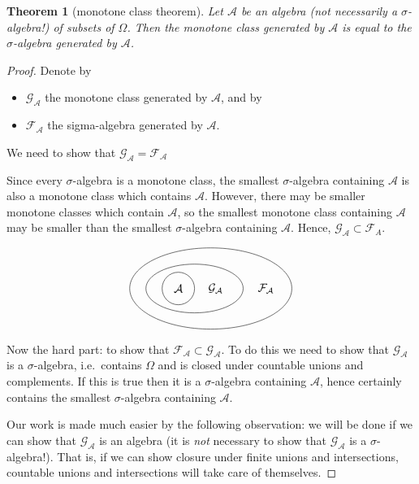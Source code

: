 \documentclass[a4paper,12pt]{scrreprt}
\theoremstyle{definition}
\theoremstyle{plain}
\newtheorem{theorem}[definition]{Theorem}
\theoremstyle{remark}
\begin{document}
\begin{theorem}[monotone class theorem]
  \label{thm:monotoneclasstheorem}
  Let $\mathcal{A}$ be an algebra (not necessarily a $\sigma$-algebra!) of subsets of $\Omega$. Then the monotone class generated by $\mathcal{A}$ is equal to the $\sigma$-algebra generated by $\mathcal{A}$.
\end{theorem}
\begin{proof}
  Denote by
  \begin{itemize}
    \item $\mathcal{G}_{\mathcal{A}}$ the monotone class generated by $\mathcal{A}$, and by
    \item $\mathcal{F}_{\mathcal{A}}$ the sigma-algebra generated by $\mathcal{A}$.
  \end{itemize}
  We need to show that $\mathcal{G}_{\mathcal{A}} = \mathcal{F}_{\mathcal{A}}$

  Since every $\sigma$-algebra is a monotone class, the smallest $\sigma$-algebra containing $\mathcal{A}$ is also a monotone class which contains $\mathcal{A}$. However, there may be smaller monotone classes which contain $\mathcal{A}$, so the smallest monotone class containing $\mathcal{A}$ may be smaller than the smallest $\sigma$-algebra containing $\mathcal{A}$. Hence, $\mathcal{G}_{\mathcal{A}} \subset \mathcal{F}_{A}$.

  \begin{equation*}
    \begin{tikzpicture}
      \node at (0, 0) {$\mathcal{A}$};
      \node at (1.15, 0) {$\mathcal{G}_{\mathcal{A}}$};
      \node at (2.7, 0) {$\mathcal{F}_{\mathcal{A}}$};
      \draw (0, 0) circle [radius=0.5];
      \draw (0.5, 0) ellipse (1.5 and 0.75);
      \draw (1, 0) ellipse (2.5 and 1.25);
    \end{tikzpicture}
  \end{equation*}

  Now the hard part: to show that $\mathcal{F}_{\mathcal{A}} \subset \mathcal{G}_{\mathcal{A}}$. To do this we need to show that $\mathcal{G}_{\mathcal{A}}$ is a $\sigma$-algebra, i.e.\ contains $\Omega$ and is closed under countable unions and complements. If this is true then it is a $\sigma$-algebra containing $\mathscr{A}$, hence certainly contains the smallest $\sigma$-algebra containing $\mathscr{A}$.

  Our work is made much easier by the following observation: we will be done if we can show that $\mathcal{G}_{\mathcal{A}}$ is an algebra (it is \emph{not} necessary to show that $\mathcal{G}_{\mathcal{A}}$ is a $\sigma$-algebra!). That is, if we can show closure under finite unions and intersections, countable unions and intersections will take care of themselves.


\end{proof}
\end{document}
